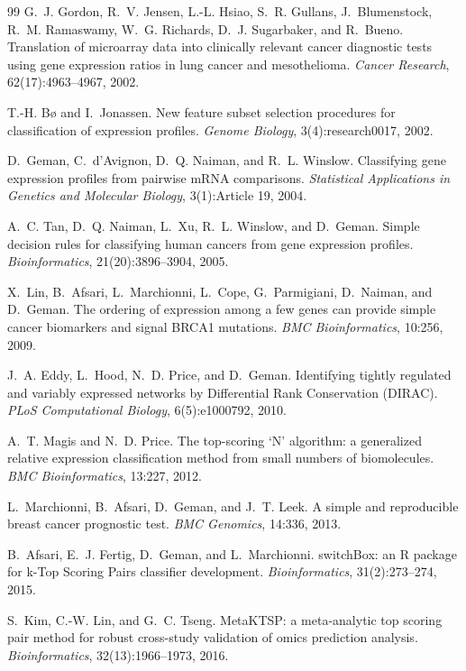 \documentclass[journal]{IEEEtran}
\begin{document}
\begin{thebibliography}{99}
G.~J. Gordon, R.~V. Jensen, L.-L. Hsiao, S.~R. Gullans, J.~Blumenstock, R.~M. Ramaswamy, W.~G. Richards, D.~J. Sugarbaker, and R.~Bueno.
\newblock Translation of microarray data into clinically relevant cancer diagnostic tests using gene expression ratios in lung cancer and mesothelioma.
\newblock \emph{Cancer Research}, 62(17):4963--4967, 2002.

T.-H. B{\o} and I.~Jonassen.
\newblock New feature subset selection procedures for classification of expression profiles.
\newblock \emph{Genome Biology}, 3(4):research0017, 2002.

D.~Geman, C.~d'Avignon, D.~Q. Naiman, and R.~L. Winslow.
\newblock Classifying gene expression profiles from pairwise mRNA comparisons.
\newblock \emph{Statistical Applications in Genetics and Molecular Biology}, 3(1):Article 19, 2004.

A.~C. Tan, D.~Q. Naiman, L.~Xu, R.~L. Winslow, and D.~Geman.
\newblock Simple decision rules for classifying human cancers from gene expression profiles.
\newblock \emph{Bioinformatics}, 21(20):3896--3904, 2005.

X.~Lin, B.~Afsari, L.~Marchionni, L.~Cope, G.~Parmigiani, D.~Naiman, and D.~Geman.
\newblock The ordering of expression among a few genes can provide simple cancer biomarkers and signal BRCA1 mutations.
\newblock \emph{BMC Bioinformatics}, 10:256, 2009.

J.~A. Eddy, L.~Hood, N.~D. Price, and D.~Geman.
\newblock Identifying tightly regulated and variably expressed networks by Differential Rank Conservation (DIRAC).
\newblock \emph{PLoS Computational Biology}, 6(5):e1000792, 2010.

A.~T. Magis and N.~D. Price.
\newblock The top-scoring `N' algorithm: a generalized relative expression classification method from small numbers of biomolecules.
\newblock \emph{BMC Bioinformatics}, 13:227, 2012.

L.~Marchionni, B.~Afsari, D.~Geman, and J.~T. Leek.
\newblock A simple and reproducible breast cancer prognostic test.
\newblock \emph{BMC Genomics}, 14:336, 2013.

B.~Afsari, E.~J. Fertig, D.~Geman, and L.~Marchionni.
\newblock switchBox: an R package for k-Top Scoring Pairs classifier development.
\newblock \emph{Bioinformatics}, 31(2):273--274, 2015.

S.~Kim, C.-W. Lin, and G.~C. Tseng.
\newblock MetaKTSP: a meta-analytic top scoring pair method for robust cross-study validation of omics prediction analysis.
\newblock \emph{Bioinformatics}, 32(13):1966--1973, 2016.


\end{thebibliography}
\end{document}
